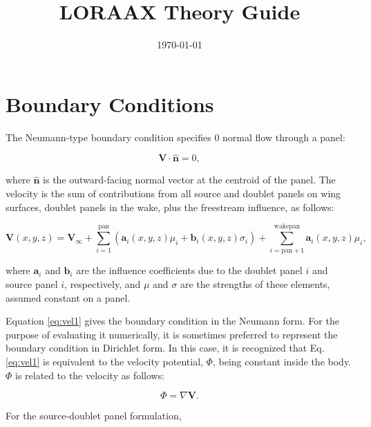 \documentclass[11pt]{article}
\begin{document}
\title{LORAAX Theory Guide}
\date{\today}
\maketitle

\tableofcontents

\section{Boundary Conditions}\label{sec:bcs}

The Neumann-type boundary condition specifies 0 normal flow through a panel:

\begin{equation}
\mathbf{V}\cdot{\mathbf{\hat{n}}} = 0,
\label{eq:bc1}
\end{equation}

\noindent where $\mathbf{\hat{n}}$ is the outward-facing normal vector at the centroid of
the panel. The velocity is the sum of contributions from all source and doublet panels on
wing surfaces, doublet panels in the wake, plus the freestream influence, as follows:

\begin{equation}
\mathbf{V}(x,y,z) = \mathbf{V}_\infty
                  + \sum_{i=1}^{\text{pan}}\left(\mathbf{a}_i(x,y,z)\mu_i
                  +                              \mathbf{b}_i(x,y,z)\sigma_i\right)
                  + \sum_{i=\text{pan}+1}^{\text{wakepan}}\mathbf{a}_i(x,y,z)\mu_i,
\label{eq:vel1}
\end{equation}

\noindent where $\mathbf{a}_i$ and $\mathbf{b}_i$ are the influence
coefficients due to the
doublet panel $i$ and source panel $i$, respectively, and $\mu$ and $\sigma$ are
the strengths of these elements, assumed constant on a panel.

Equation \ref{eq:vel1} gives the boundary condition in the Neumann form. For the purpose
of evaluating it numerically, it is sometimes preferred to represent the boundary
condition in Dirichlet form. In this case, it is recognized that Eq. \ref{eq:vel1} is
equivalent to the velocity potential, $\Phi$, being constant inside the body. $\Phi$ is
related to the velocity as follows:

\begin{equation}
\Phi = \nabla\mathbf{V}.
\label{eq:phi1}
\end{equation}

For the source-doublet panel formulation,
\end{document}
